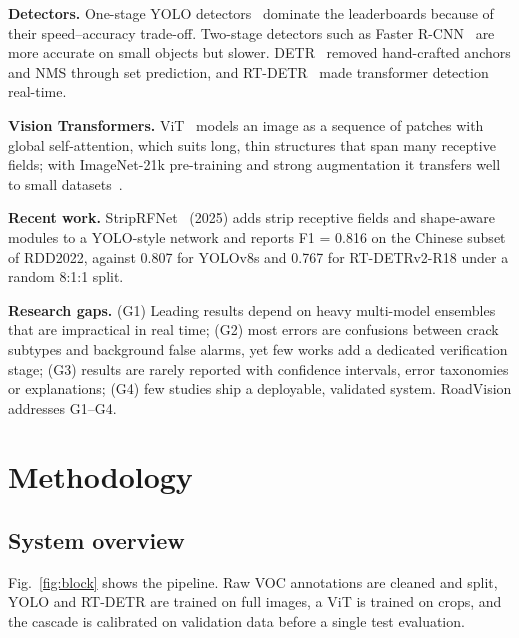 \IfFileExists{IEEEtran.cls}{\documentclass[conference]{IEEEtran}}%
\begin{document}
\textbf{Detectors.} One-stage YOLO detectors~\cite{yolo,yolov8} dominate the leaderboards because of their speed--accuracy trade-off. Two-stage detectors such as Faster R-CNN~\cite{fasterrcnn} are more accurate on small objects but slower. DETR~\cite{detr} removed hand-crafted anchors and NMS through set prediction, and RT-DETR~\cite{rtdetr} made transformer detection real-time.

\textbf{Vision Transformers.} ViT~\cite{vit} models an image as a sequence of patches with global self-attention, which suits long, thin structures that span many receptive fields; with ImageNet-21k pre-training and strong augmentation it transfers well to small datasets~\cite{steiner}.

\textbf{Recent work.} StripRFNet~\cite{striprfnet} (2025) adds strip receptive fields and shape-aware modules to a YOLO-style network and reports F1 = 0.816 on the Chinese subset of RDD2022, against 0.807 for YOLOv8s and 0.767 for RT-DETRv2-R18 under a random 8:1:1 split.

\textbf{Research gaps.} (G1) Leading results depend on heavy multi-model ensembles that are impractical in real time; (G2) most errors are confusions between crack subtypes and background false alarms, yet few works add a dedicated verification stage; (G3) results are rarely reported with confidence intervals, error taxonomies or explanations; (G4) few studies ship a deployable, validated system. RoadVision addresses G1--G4.

\section{Methodology}
\subsection{System overview}
Fig.~\ref{fig:block} shows the pipeline. Raw VOC annotations are cleaned and split, YOLO and RT-DETR are trained on full images, a ViT is trained on crops, and the cascade is calibrated on validation data before a single test evaluation.
\end{document}
